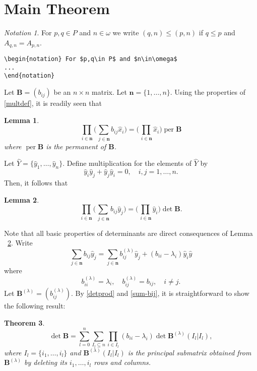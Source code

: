 \documentclass{article}
\newtheorem{thm}{Theorem}[section]
\newtheorem{lem}[thm]{Lemma}
\theoremstyle{definition}
\theoremstyle{remark}
\newtheorem*{notation}{Notation}
\newcommand{\wh}{\widehat}
\DeclareMathOperator{\per}{per}
\begin{document}
\section{Main Theorem}
\label{s:mt}

\begin{notation} For $p,q\in P$ and $n\in\omega$ we write
$(q,n)\le(p,n)$ if $q\le p$ and $A_{q,n}=A_{p,n}$.
\begin{verbatim}
\begin{notation} For $p,q\in P$ and $n\in\omega$
...
\end{notation}
\end{verbatim}
\end{notation}

Let $\mathbf{B}=(b_{ij})$ be an $n\times n$ matrix. Let $\mathbf{n}=\{1,
\dots,n\}$. Using the properties of \eqref{multdef}, it is readily seen
that

\begin{lem}\label{lem-per}
\begin{equation}
\prod_{i\in\mathbf{n}}
\biggl(\sum_{\,j\in\mathbf{n}}b_{ij}\hat x_i\biggr)
=\biggl(\prod_{\,i\in\mathbf{n}}\hat x_i\biggr)\per \mathbf{B}
\end{equation}
where $\per \mathbf{B}$ is the permanent of $\mathbf{B}$.
\end{lem}

Let $\wh Y=\{\hat y_1,\dots,\hat y_n\}$. Define multiplication
for the elements of $\wh Y$ by
\begin{equation}
\hat y_i\hat y_j+\hat y_j\hat y_i=0,\quad i,j=1,\dots,n.
\end{equation}
Then, it follows that
\begin{lem}\label{lem-det}
\begin{equation}\label{detprod}
\prod_{i\in\mathbf{n}}
\biggl(\sum_{\,j\in\mathbf{n}}b_{ij}\hat y_j\biggr)
=\biggl(\prod_{\,i\in\mathbf{n}}\hat y_i\biggr)\det\mathbf{B}.
\end{equation}
\end{lem}

Note that all basic properties of determinants are direct consequences
of Lemma ~\ref{lem-det}. Write
\begin{equation}\label{sum-bij}
\sum_{j\in\mathbf{n}}b_{ij}\hat y_j=\sum_{j\in\mathbf{n}}b^{(\lambda)}
_{ij}\hat y_j+(b_{ii}-\lambda_i)\hat y_i\hat y
\end{equation}
where
\begin{equation}
b^{(\lambda)}_{ii}=\lambda_i,\quad b^{(\lambda)}_{ij}=b_{ij},
\quad i\not=j.
\end{equation}
Let $\mathbf{B}^{(\lambda)}=(b^{(\lambda)}_{ij})$. By \eqref{detprod}
and \eqref{sum-bij}, it is
straightforward to show the following
result:
\begin{thm}\label{thm-main}
\begin{equation}\label{detB}
\det\mathbf{B}=
\sum^n_{l =0}\sum_{I_l \subseteq n}
\prod_{i\in I_l}(b_{ii}-\lambda_i)
\det\mathbf{B}^{(\lambda)}(I_l |I_l ),
\end{equation}
where $I_l =\{i_1,\dots,i_l \}$ and $\mathbf{B}^{(\lambda)}(I_l |I_l )$
is the principal submatrix obtained from $\mathbf{B}^{(\lambda)}$
by deleting its $i_1,\dots,i_l $ rows and columns.
\end{thm}
\end{document}
